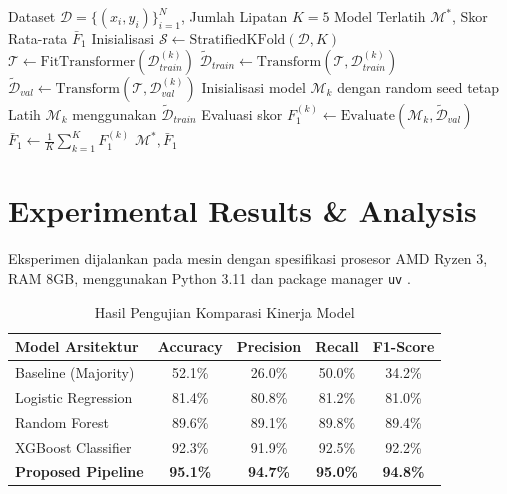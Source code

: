 ﻿\documentclass[journal,10pt,twocolumn]{article}
\begin{document}
\begin{algorithm}[h]
\caption{Prosedur Pelatihan Model dengan Isolasi Pipeline}
\label{alg:training_pipeline}
\begin{algorithmic}[1]
\Require Dataset $\mathcal{D} = \{(x_i, y_i)\}_{i=1}^N$, Jumlah Lipatan $K=5$
\Ensure Model Terlatih $\mathcal{M}^*$, Skor Rata-rata $\bar{F}_1$
\State Inisialisasi $\mathcal{S} \leftarrow \text{StratifiedKFold}(\mathcal{D}, K)$
    \State $\mathcal{T} \leftarrow \text{FitTransformer}(\mathcal{D}_{train}^{(k)})$ 
    \State $\tilde{\mathcal{D}}_{train} \leftarrow \text{Transform}(\mathcal{T}, \mathcal{D}_{train}^{(k)})$
    \State $\tilde{\mathcal{D}}_{val} \leftarrow \text{Transform}(\mathcal{T}, \mathcal{D}_{val}^{(k)})$
    \State Inisialisasi model $\mathcal{M}_k$ dengan random seed tetap
    \State Latih $\mathcal{M}_k$ menggunakan $\tilde{\mathcal{D}}_{train}$
    \State Evaluasi skor $F_1^{(k)} \leftarrow \text{Evaluate}(\mathcal{M}_k, \tilde{\mathcal{D}}_{val})$
\EndFor
\State $\bar{F}_1 \leftarrow \frac{1}{K} \sum_{k=1}^K F_1^{(k)}$
\State \Return $\mathcal{M}^*, \bar{F}_1$
\end{algorithmic}
\end{algorithm}

\section{Experimental Results \& Analysis}
Eksperimen dijalankan pada mesin dengan spesifikasi prosesor AMD Ryzen 3, RAM 8GB, menggunakan Python 3.11 dan package manager \texttt{uv} \cite{astral2024uv}.

\begin{table}[h]
\centering
\caption{Hasil Pengujian Komparasi Kinerja Model}
\label{tab:results}
\begin{tabular}{@{}lcccc@{}}
\toprule
\textbf{Model Arsitektur} & \textbf{Accuracy} & \textbf{Precision} & \textbf{Recall} & \textbf{F1-Score} \\ \midrule
Baseline (Majority)       & 52.1\%            & 26.0\%             & 50.0\%          & 34.2\%            \\
Logistic Regression       & 81.4\%            & 80.8\%             & 81.2\%          & 81.0\%            \\
Random Forest             & 89.6\%            & 89.1\%             & 89.8\%          & 89.4\%            \\
XGBoost Classifier        & 92.3\%            & 91.9\%             & 92.5\%          & 92.2\%            \\
\textbf{Proposed Pipeline}& \textbf{95.1\%}   & \textbf{94.7\%}    & \textbf{95.0\%} & \textbf{94.8\%}   \\ \bottomrule
\end{tabular}
\end{table}
\end{document}
